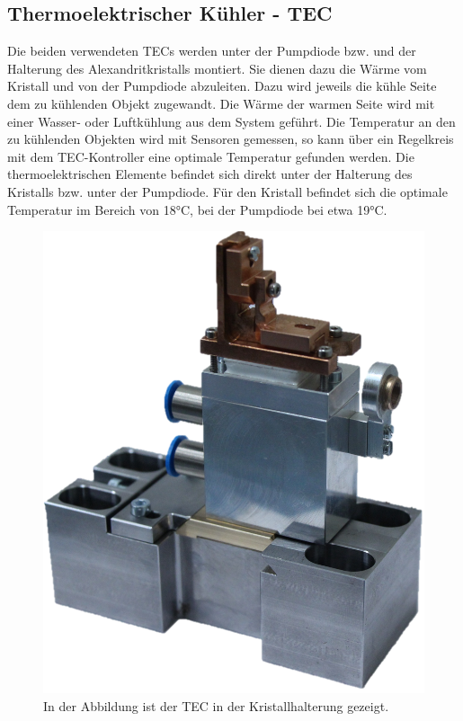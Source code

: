 \subsection{Thermoelektrischer Kühler - TEC}
Die beiden verwendeten TECs werden unter der Pumpdiode bzw. und der Halterung des Alexandritkristalls montiert. Sie dienen dazu die Wärme vom Kristall und von der Pumpdiode abzuleiten. Dazu wird jeweils die kühle Seite dem zu kühlenden Objekt zugewandt. Die Wärme der warmen Seite wird mit einer Wasser- oder Luftkühlung aus dem System geführt. Die Temperatur an den zu kühlenden Objekten wird mit Sensoren gemessen, so kann über ein Regelkreis mit dem TEC-Kontroller eine optimale Temperatur gefunden werden. Die thermoelektrischen Elemente befindet sich direkt unter der Halterung des Kristalls bzw. unter der Pumpdiode. Für den Kristall befindet sich die optimale Temperatur im Bereich von 18°C, bei der Pumpdiode bei etwa 19°C.


\begin{figure}
    \centering
    \includegraphics[scale=0.3]{98_images/real_front_02.PNG}
    \caption{In der Abbildung ist der TEC in der Kristallhalterung gezeigt.}
    \label{fig:tec_cr_hw}
\end{figure}

